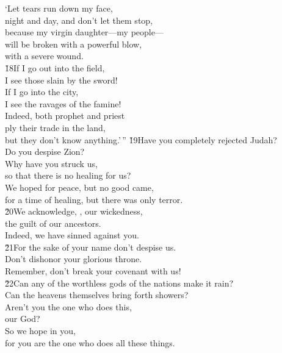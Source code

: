 \begin{poetry}
\poeml `Let tears run down my face, \\
\poemll    night and day, and don't let them stop, \\
\poeml because my virgin daughter---my people--- \\
\poemll    will be broken with a powerful blow, \\
\poemlll       with a severe wound. \\
\poeml \v{18}If I go out into the field, \\
\poemll    I see those slain by the sword! \\
\poeml If I go into the city, \\
\poemll    I see the ravages of the famine! \\
\poeml Indeed, both prophet and priest \\
\poemll    ply their trade in the land, \\
\poemlll       but they don't know anything.'\,''
\poeml \v{19}Have you completely rejected Judah? \\
\poemll    Do you despise Zion? \\
\poeml Why have you struck us, \\
\poemll    so that there is no healing for us? \\
\poeml We hoped for peace, but no good came, \\
\poemll    for a time of healing, but there was only terror. \\
\poeml \v{20}We acknowledge, , our wickedness, \\
\poemll    the guilt of our ancestors. \\
\poeml Indeed, we have sinned against you. \\
\poeml \v{21}For the sake of your name don't despise us. \\
\poemll    Don't dishonor your glorious throne. \\
\poemlll       Remember, don't break your covenant with us! \\
\poeml \v{22}Can any of the worthless gods of the nations make it rain? \\
\poemll    Can the heavens themselves bring forth showers? \\
\poeml Aren't you the one who does this, \\
\poemll    {} our God? \\
\poeml So we hope in you, \\
\poemll    for you are the one who does all these things.
\end{poetry}

